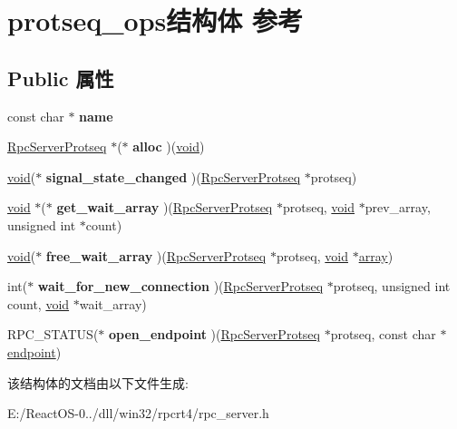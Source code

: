 \hypertarget{structprotseq__ops}{}\section{protseq\+\_\+ops结构体 参考}
\label{structprotseq__ops}
\subsection*{Public 属性}
\begin{DoxyCompactItemize}
\item 
\mbox{\label{structprotseq__ops_a64ade2ec8c0fbf5b7e7db6147dfa9972}} 
const char $\ast$ {\bfseries name}
\item 
\mbox{\label{structprotseq__ops_ad45086ce211596e936d5e9801abccbf4}} 
\hyperlink{struct___rpc_server_protseq}{Rpc\+Server\+Protseq} $\ast$($\ast$ {\bfseries alloc} )(\hyperlink{interfacevoid}{void})
\item 
\mbox{\label{structprotseq__ops_a6566aa1a021d701044517a2ad9777d61}} 
\hyperlink{interfacevoid}{void}($\ast$ {\bfseries signal\+\_\+state\+\_\+changed} )(\hyperlink{struct___rpc_server_protseq}{Rpc\+Server\+Protseq} $\ast$protseq)
\item 
\mbox{\label{structprotseq__ops_aa5342e55eeb08758f8aff16390ab6ba9}} 
\hyperlink{interfacevoid}{void} $\ast$($\ast$ {\bfseries get\+\_\+wait\+\_\+array} )(\hyperlink{struct___rpc_server_protseq}{Rpc\+Server\+Protseq} $\ast$protseq, \hyperlink{interfacevoid}{void} $\ast$prev\+\_\+array, unsigned int $\ast$count)
\item 
\mbox{\label{structprotseq__ops_a9dd1431b62c4e43041e7fecdc951d5ee}} 
\hyperlink{interfacevoid}{void}($\ast$ {\bfseries free\+\_\+wait\+\_\+array} )(\hyperlink{struct___rpc_server_protseq}{Rpc\+Server\+Protseq} $\ast$protseq, \hyperlink{interfacevoid}{void} $\ast$\hyperlink{structarray}{array})
\item 
\mbox{\label{structprotseq__ops_a00360c7045716c97a484f00aac955969}} 
int($\ast$ {\bfseries wait\+\_\+for\+\_\+new\+\_\+connection} )(\hyperlink{struct___rpc_server_protseq}{Rpc\+Server\+Protseq} $\ast$protseq, unsigned int count, \hyperlink{interfacevoid}{void} $\ast$wait\+\_\+array)
\item 
\mbox{\label{structprotseq__ops_a07d3c8c1da0801758e143579341afbc3}} 
R\+P\+C\+\_\+\+S\+T\+A\+T\+US($\ast$ {\bfseries open\+\_\+endpoint} )(\hyperlink{struct___rpc_server_protseq}{Rpc\+Server\+Protseq} $\ast$protseq, const char $\ast$\hyperlink{structendpoint}{endpoint})
\end{DoxyCompactItemize}


该结构体的文档由以下文件生成\+:\begin{DoxyCompactItemize}
\item 
E\+:/\+React\+O\+S-\/0../dll/win32/rpcrt4/rpc\+\_\+server.\+h\end{DoxyCompactItemize}
